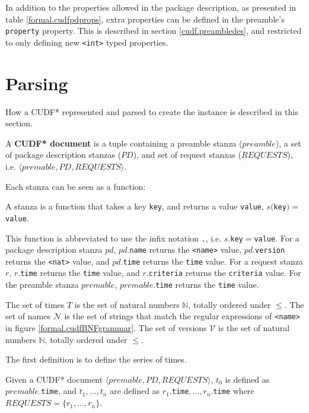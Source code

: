 In addition to the properties allowed in the package description, as presented in table \ref{formal.cudfpdprops}, extra properties can be defined in the preamble's \texttt{property} property.
This is described in section \ref{cudf.preambledes}, and restricted to only defining new \texttt{<int>} typed properties.

\section{Parsing}
How a CUDF* represented and parsed to create the \modelname instance is described in this section.

\begin{defs}
A \textbf{CUDF* document} is a tuple containing a preamble stanza ($preamble$), a set of package description stanzas ($PD$), and set of request stanzas ($REQUESTS$), i.e. $\langle premable, PD, REQUESTS \rangle$.
\end{defs}

Each stanza can be seen as a function:
\begin{defs}
A stanza is a function that takes a key \texttt{key}, and returns a value \texttt{value}, $s($\texttt{key}$) = $\texttt{value}. 
\end{defs}

This function is abbreviated to use the infix notation \texttt{.}, i.e. $s$.\texttt{key}$ = $\texttt{value}.
For a package description stanza $pd$, $pd$.\texttt{name} returns the \texttt{<name>} value,
$pd$.\texttt{version} returns the \texttt{<nat>} value, and $pd$.\texttt{time} returns the \texttt{time} value.
For a request stanza $r$, $r$.\texttt{time} returns the \texttt{time} value, and $r$.\texttt{criteria} returns the \texttt{criteria} value.
For the preamble stanza $premable$, $premable$.\texttt{time} returns the \texttt{time} value.

The set of times $T$ is the set of natural numbers $\mathbb{N}$, totally ordered under $\leq$.
The set of names $\mathcal{N}$ is the set of strings that match the regular expressions of \texttt{<name>} in figure \ref{formal.cudfBNFgrammar}.
The set of versions $\mathcal{V}$ is the set of natural numbers $\mathbb{N}$, totally ordered under $\leq$. 

The first definition is to define the series of times.
\begin{defs}
Given a CUDF* document $\langle premable, PD, REQUESTS \rangle$, $t_0$ is defined as $premable$.\texttt{time},
and $t_1,\ldots,t_n$ are defined as $r_1$.\texttt{time}$,\ldots,r_n$.\texttt{time} where $REQUESTS = \{r_1,\ldots,r_n\}$.
\end{defs}


